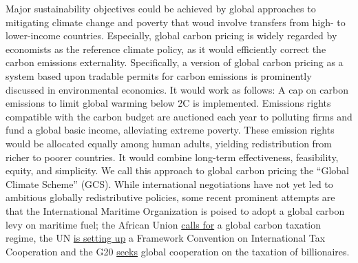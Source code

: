 \documentclass[12pt,english]{article}
\begin{document}
Major sustainability objectives could be achieved by global approaches to mitigating climate change and poverty that woud involve transfers from high- to lower-income countries.\citep{budolfson_climate_2021,franks_mobilizing_2018,dennig_inequality_2015,soergel_combining_2021,bauer_quantification_2020,cramton_global_2017} 
Especially, global carbon pricing is widely regarded by economists as the reference climate policy, as it would efficiently correct the carbon emissions externality. Specifically, a version of global carbon pricing as a system based upon tradable permits for carbon emissions is prominently discussed in environmental economics.\citep{grubb_greenhouse_1990,hoel_carbon_1991,agarwal_global_1991,bertram_tradeable_1992,baer_equity_2000,jamieson_climate_2001,blanchard_major_2021} It would work as follows: A cap on carbon emissions to limit global warming below 2\textdegree{}C is implemented. Emissions rights compatible with the carbon budget are auctioned each year to polluting firms and fund a global basic income, alleviating extreme poverty. These emission rights would be allocated 
equally among human adults, yielding redistribution from richer to poorer countries. It would combine long-term effectiveness, feasibility, equity, and simplicity.\citep{grubb_greenhouse_1990} We call this approach to global carbon pricing the ``Global Climate Scheme'' (GCS).
While international negotiations have not yet led to ambitious globally redistributive policies, %
some recent prominent attempts are that the International Maritime Organization is poised to adopt a global carbon levy on maritime fuel; the 
African Union \href{https://media.africaclimatesummit.org/NAIROBI+Declaration+FURTHER+edited+060923+EN+920AM.pdf}{calls for} a global carbon taxation regime, %
the UN \href{https://digitallibrary.un.org/record/4032838}{is setting up} a Framework Convention on International Tax Cooperation and  %
the G20 \href{https://www.gov.br/fazenda/pt-br/assuntos/g20/declaracoes/1-g20-ministerial-declaration-international-taxation-cooperation.pdf}{seeks} global cooperation on the taxation of billionaires. %
\end{document}
